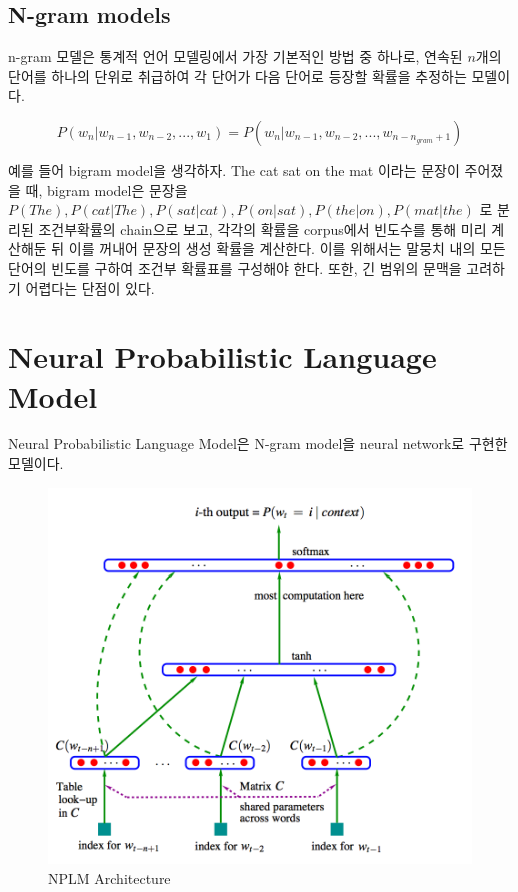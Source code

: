 \documentclass[
	11pt,
	a4paper,
	figtabcapt,
]{oblivoir}
\begin{document}
\subsection{N-gram models}
n-gram 모델은 통계적 언어 모델링에서 가장 기본적인 방법 중 하나로,
연속된 $n$개의 단어를 하나의 단위로 취급하여 각 단어가 다음 단어로 등장할 확률을 추정하는 모델이다.

\begin{equation}
	P(w_n | w_{n-1}, w_{n-2}, ..., w_1) = P(w_n | w_{n-1}, w_{n-2}, ..., w_{n - n_{gram} + 1})
\end{equation}

예를 들어 bigram model을 생각하자.
The cat sat on the mat
이라는 문장이 주어졌을 때, bigram model은 문장을 $P(The), P(cat|The), P(sat|cat), P(on|sat), P(the|on), P(mat|the)$ 로 분리된 조건부확률의 chain으로 보고,
각각의 확률을 corpus에서 빈도수를 통해 미리 계산해둔 뒤 이를 꺼내어 문장의 생성 확률을 계산한다.
이를 위해서는 말뭉치 내의 모든 단어의 빈도를 구하여 조건부 확률표를 구성해야 한다. 또한, 긴 범위의 문맥을 고려하기 어렵다는 단점이 있다.

\section{Neural Probabilistic Language Model}
Neural Probabilistic Language Model\cite{bengio2003neural}은 N-gram model을 neural network로 구현한 모델이다.
\begin{figure}[htp]
	\centering
	\includegraphics[width=0.5 \textwidth]{figures/NPLM.png} 
	\caption{NPLM Architecture}
	\label{fig:NPLM}
\end{figure}
\end{document}
